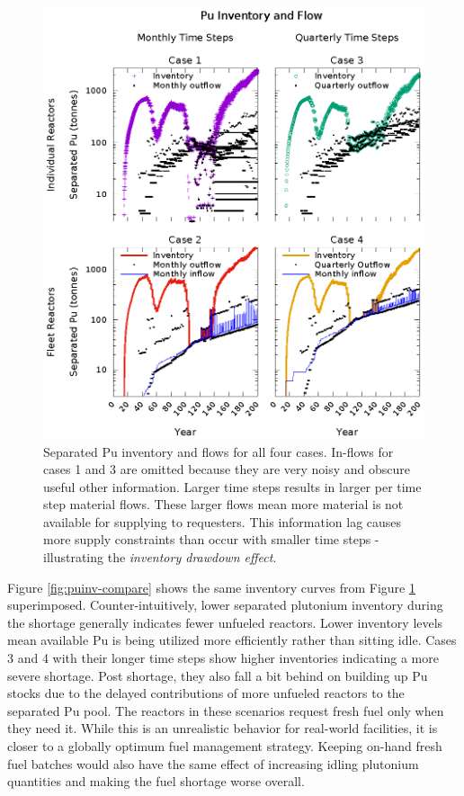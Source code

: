\documentclass{style}
\begin{document}
\begin{figure}[!h]
    \centering
    \includegraphics[width=1.0\textwidth]{exp2/puinv.eps}
    \caption[Separated Pu inventory and flow]{
        Separated Pu inventory and flows for all four cases.  In-flows for
        cases 1 and 3 are omitted because they are very noisy and obscure
        useful other information.  Larger time steps results in larger per
        time step material flows. These larger flows mean more material is not
        available for supplying to requesters.  This information lag causes
        more supply constraints than occur with smaller time steps -
        illustrating the \emph{inventory drawdown effect}.
    }
    \label{fig:puinv}
\end{figure}

Figure \ref{fig:puinv-compare} shows the same inventory curves from Figure
\ref{fig:puinv} superimposed. Counter-intuitively, lower separated plutonium
inventory during the shortage generally indicates fewer unfueled reactors.
Lower inventory levels mean available Pu is being utilized more efficiently
rather than sitting idle.  Cases 3 and 4 with their longer time steps show
higher inventories indicating a more severe shortage.  Post shortage, they
also fall a bit behind on building up Pu stocks due to the delayed
contributions of more unfueled reactors to the separated Pu pool.  The
reactors in these scenarios request fresh fuel only when they need it. While
this is an unrealistic behavior for real-world facilities, it is closer to a
globally optimum fuel management strategy.  Keeping on-hand fresh fuel batches
would also have the same effect of increasing idling plutonium quantities and
making the fuel shortage worse overall.
\end{document}
